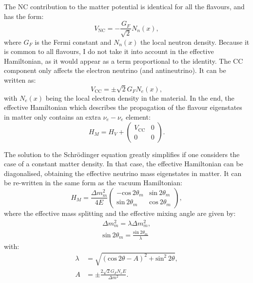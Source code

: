 The NC contribution to the matter potential is identical for all the flavours, and has the form:
\begin{equation}
	V_{\mathrm{NC}} = -\frac{G_{F}}{\sqrt{2}} N_{n}(x),
\end{equation}
where $G_{F}$ is the Fermi constant and $N_{n}(x)$ the local neutron density. Because it is common to all flavours, I do not take it into account in the effective Hamiltonian, as it would appear as a term proportional to the identity. The CC component only affects the electron neutrino (and antineutrino). It can be written as:
\begin{equation}
	V_{\mathrm{CC}} = \pm \sqrt{2} G_{F} N_{e}(x),
\end{equation}
with $N_{e}(x)$ being the local electron density in the material. In the end, the effective Hamiltonian which describes the propagation of the flavour eigenstates in matter only contains an extra $\nu_{e}-\nu_{e}$ element:
\begin{equation}
	H_{M} = H_{V} + \begin{pmatrix}V_{\mathrm{CC}}&0\\0&0\end{pmatrix}.
\end{equation}

The solution to the Schrödinger equation greatly simplifies if one considers the case of a constant matter density. In that case, the effective Hamiltonian can be diagonalised, obtaining the effective neutrino mass eigenstates in matter. It can be re-written in the same form as the vacuum Hamiltonian:
\begin{equation}
	H_{M} = \frac{\Delta m_{m}^{2}}{4E} \begin{pmatrix}-\mathrm{cos}~2\theta_{m}&\mathrm{sin}~2\theta_{m}\\\mathrm{sin}~2\theta_{m}&\mathrm{cos}~2\theta_{m}\end{pmatrix},
\end{equation}
where the effective mass splitting and the effective mixing angle are given by:
\begin{equation}
	\begin{split}
		\Delta m_{m}^{2} = \lambda \Delta m_{m}^{2},\\
		\mathrm{sin}~2\theta_{m} = \frac{\mathrm{sin}~2\theta_{m}}{\lambda}
	\end{split}
\end{equation}
with:
\begin{equation}
	\begin{split}
		\lambda &= \sqrt{(\mathrm{cos}~2\theta - A)^{2} + \mathrm{sin}^{2}~2\theta},\\
		A &= \pm \frac{2\sqrt{2}G_{F}N_{e}E}{\Delta m^{2}}.
	\end{split}
\end{equation}

